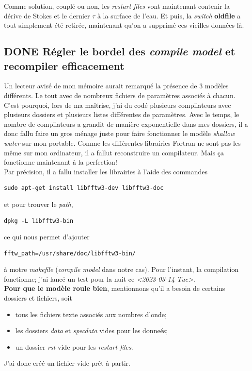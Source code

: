 \documentclass{article}
\numberwithin{equation}{section}
\begin{document}
Comme solution, couplé ou non, les \emph{restart files} vont maintenant contenir la dérive de Stokes et le dernier \(\tau\) à la surface de l'eau.
Et puis, la \emph{switch} \textbf{oldfile} a tout simplement été retirée, maintenant qu'on a supprimé ces vieilles données-là.

\subsection{{\bfseries\sffamily DONE} Régler le bordel des \emph{compile model} et recompiler efficacement}
\label{sec:org70abb87}
Un lecteur avisé de mon mémoire aurait remarqué la présence de 3 modèles différents.
Le tout avec de nombreux fichiers de paramètres associés à chacun.
C'est pourquoi, lors de ma maîtrise, j'ai du codé plusieurs compilateurs avec plusieurs dossiers et plusieurs listes différentes de paramètres.
Avec le temps, le nombre de compilateurs a grandit de manière exponentielle dans mes dossiers, il a donc fallu faire un gros ménage juste pour faire  fonctionner le modèle \emph{shallow water} sur mon portable.
Comme  les différentes librairies Fortran ne sont pas les même sur mon ordinateur, il a fallut reconstruire un compilateur.
Mais ça fonctionne maintenant à la perfection!\\[0pt]


Par précision, il a fallu installer les librairies à l'aide des commandes
\begin{verbatim}
sudo apt-get install libfftw3-dev libfftw3-doc
\end{verbatim}
et pour trouver le \emph{path},
\begin{verbatim}
dpkg -L libfftw3-bin
\end{verbatim}
ce qui nous permet d'ajouter
\begin{verbatim}
fftw_path=/usr/share/doc/libfftw3-bin/
\end{verbatim}
à motre \emph{makefile} (\emph{compile model} dans notre cas). 
Pour l'instant, la compilation fonctionne; j'ai lancé un test pour la nuit ce \textit{<2023-03-14 Tue>}.\\[0pt]

\textbf{Pour que le modèle roule bien}, mentionnons qu'il a besoin de certains dossiers et fichiers, soit 
\begin{itemize}
\item tous les fichiers texte associés aux nombres d'onde;
\item les dossiers \emph{data} et \emph{specdata} vides pour les donneés;
\item un dossier \emph{rst} vide pour les \emph{restart files}.
\end{itemize}
J'ai donc créé un fichier vide prêt à partir.
\end{document}
